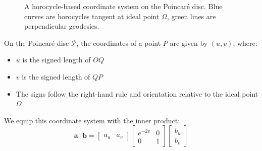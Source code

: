 \begin{figure}[ht]
\centering
{}
\caption{A horocycle-based coordinate system on the Poincaré disc. Blue curves are horocycles tangent at ideal point $\Omega$, green lines are perpendicular geodesics.}\label{fig:horocyclecoord}
\end{figure}

On the Poincaré disc $\mathcal{P}$, the coordinates of a point $P$ are given by $(u,v)$, where:
\begin{itemize}
\item $u$ is the signed length of $OQ$
\item $v$ is the signed length of $QP$
\item The signs follow the right-hand rule and orientation relative to the ideal point $\Omega$
\end{itemize}

We equip this coordinate system with the inner product:
$$
\mathbf{a} \cdot \mathbf{b} = \begin{bmatrix} a_u & a_v \end{bmatrix} \begin{bmatrix} e^{-2v} & 0 \\ 0 & 1 \end{bmatrix} \begin{bmatrix} b_u \\ b_v \end{bmatrix}
$$

